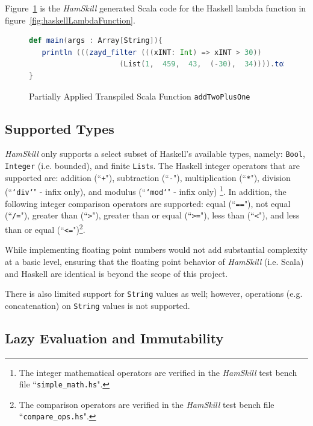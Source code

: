 \documentclass{report}
\begin{document}
Figure~\ref{fig:scalaLambdaFunction} is the \textit{HamSkill} generated Scala code for the Haskell lambda function in figure~\ref{fig:haskellLambdaFunction}.

\begin{figure}[H]
\begin{mdframed}
\begin{lstlisting}[language=Scala, basicstyle=\scriptsize]
def main(args : Array[String]){
   println (((zayd_filter (((xINT: Int) => xINT > 30)) 
                     (List(1,  459,  43,  (-30),  34)))).toString())
} 
\end{lstlisting}
\end{mdframed}
\caption{Partially Applied Transpiled Scala Function \texttt{addTwoPlusOne}}\label{fig:scalaLambdaFunction}
\end{figure}

\subsection{Supported Types}\label{sec:supportedTypes}

\emph{HamSkill} only supports a select subset of Haskell's available types, namely: \texttt{Bool}, \texttt{\tt Integer} (i.e. bounded), and finite \texttt{List}s.  The Haskell integer operators that are supported are: addition (``\texttt{+}"), subtraction (``\texttt{-}"), multiplication (``\texttt{*}"), division (``\texttt{`div`}" - infix only), and modulus (``\texttt{`mod`}" - infix only) \footnote{The integer mathematical operators are verified in the \textit{HamSkill} test bench file ``\texttt{simple\_math.hs}".}.  In addition, the following integer comparison operators are supported: equal (``\texttt{==}"), not equal (``\texttt{/=}"), greater than (``\texttt{>}"), greater than or equal (``\texttt{>=}"), less than (``\texttt{<}"), and less than or equal (``\texttt{<=}")\footnote{The comparison operators are verified in the \textit{HamSkill} test bench file ``\texttt{compare\_ops.hs}".}.

While implementing floating point numbers would not add substantial complexity at a basic level, ensuring that the floating point behavior of \emph{HamSkill} (i.e. Scala) and Haskell are identical is beyond the scope of this project.

There is also limited support for \texttt{String} values as well; however, operations (e.g. concatenation) on \texttt{String} values is not supported.

\subsection{Lazy Evaluation and Immutability}
\end{document}
